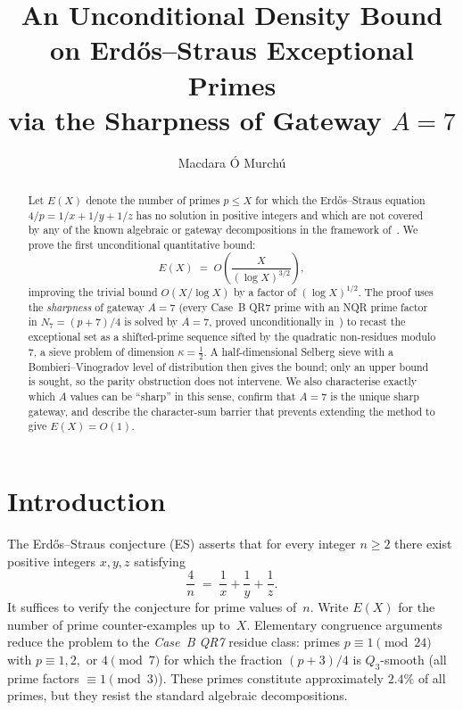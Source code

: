 \documentclass[12pt]{amsart}
\title[Unconditional Density Bound on ES Exceptions]{An Unconditional Density Bound on
Erd\H{o}s--Straus Exceptional Primes\\
via the Sharpness of Gateway $A = 7$}
\author{Macdara \'O Murch\'u}
\theoremstyle{definition}
\theoremstyle{remark}
\begin{document}
\begin{abstract}
Let $E(X)$ denote the number of primes $p \le X$ for which the
Erd\H{o}s--Straus equation $4/p = 1/x + 1/y + 1/z$ has no solution
in positive integers and which are not covered by any of the known
algebraic or gateway decompositions in the framework of~\cite{ES-paper}.
We prove the first unconditional quantitative bound:
\[
  E(X) \;=\; O\!\left(\frac{X}{(\log X)^{3/2}}\right),
\]
improving the trivial bound $O(X/\log X)$ by a factor of $(\log X)^{1/2}$.
The proof uses the \emph{sharpness} of gateway $A=7$
(every Case~B QR7 prime with an NQR prime factor in $N_7 = (p+7)/4$
is solved by $A=7$, proved unconditionally in~\cite{closure-paper})
to recast the exceptional set as a shifted-prime sequence sifted by the
quadratic non-residues modulo $7$, a sieve problem of dimension
$\kappa = \tfrac12$. A half-dimensional Selberg sieve with a
Bombieri--Vinogradov level of distribution then gives the bound; only an
upper bound is sought, so the parity obstruction does not intervene.
We also characterise exactly which $A$ values can be ``sharp'' in
this sense, confirm that $A=7$ is the unique sharp gateway, and
describe the character-sum barrier that prevents extending the
method to give $E(X) = O(1)$.
\end{abstract}

\maketitle

\section{Introduction}

The Erd\H{o}s--Straus conjecture (ES) asserts that for every integer
$n \ge 2$ there exist positive integers $x, y, z$ satisfying
\[
  \frac{4}{n} \;=\; \frac{1}{x} + \frac{1}{y} + \frac{1}{z}.
\]
It suffices to verify the conjecture for prime values of~$n$.
Write $E(X)$ for the number of prime counter-examples up to~$X$.
Elementary congruence arguments~\cite{ES-paper} reduce the
problem to the \emph{Case~B QR7} residue class: primes
$p \equiv 1 \pmod{24}$ with $p \equiv 1, 2, \text{ or } 4 \pmod{7}$
for which the fraction $(p+3)/4$ is $Q_3$-smooth
(all prime factors $\equiv 1 \pmod{3}$).
These primes constitute approximately $2.4\%$ of all primes,
but they resist the standard algebraic decompositions.
\end{document}
